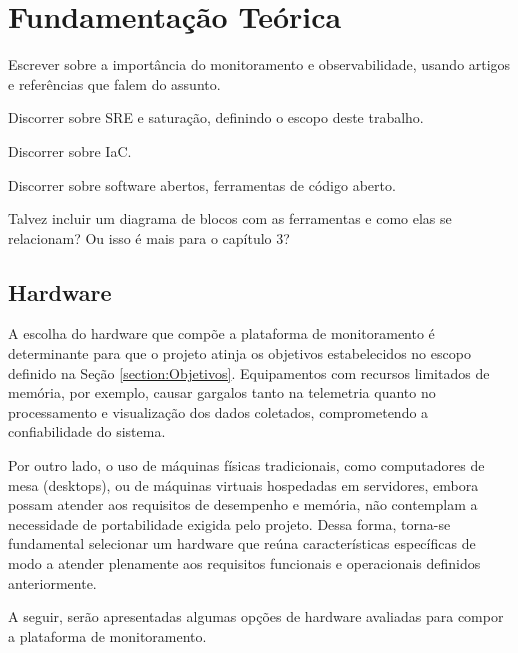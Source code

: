 \chapter{Fundamentação Teórica}
\label{chap2}





Escrever sobre a importância do monitoramento e observabilidade, usando artigos e referências que falem do assunto.

Discorrer sobre SRE e saturação, definindo o escopo deste trabalho.

Discorrer sobre IaC.

Discorrer sobre software abertos, ferramentas de código aberto.


Talvez incluir um diagrama de blocos com as ferramentas e como elas se relacionam? Ou isso é mais para o capítulo 3?

\section{Hardware}
\label{section:Hardware}

A escolha do hardware que compõe a plataforma de monitoramento é determinante para que o projeto atinja os objetivos estabelecidos no escopo definido na Seção \ref{section:Objetivos}. Equipamentos com recursos limitados de memória, por exemplo, causar gargalos tanto na telemetria quanto no processamento e visualização dos dados coletados, comprometendo a confiabilidade do sistema.

Por outro lado, o uso de máquinas físicas tradicionais, como computadores de mesa (desktops), ou de máquinas virtuais hospedadas em servidores, embora possam atender aos requisitos de desempenho e memória, não contemplam a necessidade de portabilidade exigida pelo projeto. Dessa forma, torna-se fundamental selecionar um hardware que reúna características específicas de modo a atender plenamente aos requisitos funcionais e operacionais definidos anteriormente.

A seguir, serão apresentadas algumas opções de hardware avaliadas para compor a plataforma de monitoramento.

